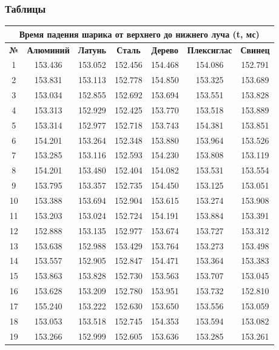 \subsubsection{Таблицы}
\begin{table}[h!]
\centering
\begin{tabular}{|c|c|c|c|c|c|c|}
\hline
\multicolumn{7}{|c|}{\textbf{Время падения шарика от верхнего до нижнего луча (t, мс)}} \\
\hline
\textbf{№} & \textbf{Алюминий} & \textbf{Латунь} & \textbf{Сталь} & \textbf{Дерево} & \textbf{Плексиглас} & \textbf{Свинец} \\
\hline
1 & 153.436 & 153.052 & 152.456 & 154.468 & 154.086 & 152.791 \\
2 & 153.831 & 153.113 & 152.778 & 154.850 & 153.325 & 153.689 \\
3 & 153.034 & 152.855 & 152.692 & 153.694 & 153.551 & 153.828 \\
4 & 153.313 & 152.929 & 152.425 & 153.770 & 153.518 & 153.889 \\
5 & 153.314 & 152.977 & 152.718 & 153.743 & 154.381 & 153.851 \\
6 & 154.201 & 153.264 & 152.348 & 153.880 & 153.964 & 153.526 \\
7 & 153.285 & 153.116 & 152.593 & 154.230 & 153.808 & 153.119 \\
8 & 154.201 & 153.480 & 152.404 & 154.082 & 153.531 & 153.554 \\
9 & 153.795 & 153.357 & 152.735 & 154.450 & 153.125 & 153.051 \\
10 & 153.388 & 153.694 & 152.904 & 153.615 & 153.274 & 153.908 \\
11 & 153.203 & 153.024 & 152.724 & 154.191 & 153.884 & 153.391 \\
12 & 152.888 & 153.135 & 152.977 & 153.674 & 153.727 & 153.312 \\
13 & 153.638 & 152.988 & 153.429 & 153.764 & 153.273 & 153.498 \\
14 & 153.557 & 152.905 & 152.847 & 154.471 & 153.364 & 153.383 \\
15 & 153.863 & 153.828 & 152.730 & 153.563 & 153.707 & 153.045 \\
16 & 153.628 & 153.209 & 152.780 & 153.951 & 153.732 & 152.810 \\
17 & 155.240 & 153.222 & 152.630 & 153.650 & 153.556 & 153.059 \\
18 & 153.053 & 153.518 & 152.745 & 154.353 & 153.594 & 153.082 \\
19 & 153.266 & 152.999 & 152.605 & 153.636 & 153.285 & 153.261 \\

\end{tabular}
\end{table}

